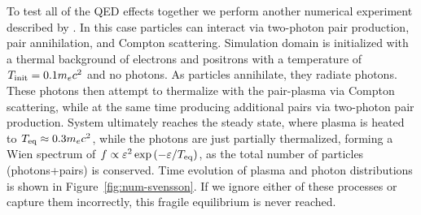 \begin{figure}[htb]
\end{figure}

To test all of the QED effects together we perform another numerical experiment described by \cite{2020arXiv201107310B}. In this case particles can interact via two-photon pair production, pair annihilation, and Compton scattering. Simulation domain is initialized with a thermal background of electrons and positrons with a temperature of $T_{\rm init}=0.1 m_e c^2$ and no photons. As particles annihilate, they radiate photons. These photons then attempt to thermalize with the pair-plasma via Compton scattering, while at the same time producing additional pairs via two-photon pair production. System ultimately reaches the steady state, where plasma is heated to $T_{\rm eq}\approx 0.3 m_e c^2$, while the photons are just partially thermalized, forming a Wien spectrum of $f\propto \varepsilon^2\exp{(-\varepsilon/T_{\rm eq})}$, as the total number of particles (photons+pairs) is conserved. Time evolution of plasma and photon distributions is shown in Figure~\ref{fig:num-svensson}. If we ignore either of these processes or capture them incorrectly, this fragile equilibrium is never reached.

